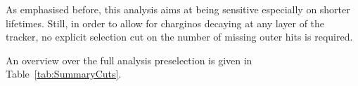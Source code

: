 As emphasised before, this analysis aims at being sensitive especially on shorter lifetimes.
Still, in order to allow for charginos decaying at any layer of the tracker, no explicit selection cut on the number of missing outer hits is required.

An overview over the full analysis preselection is given in Table~\ref{tab:SummaryCuts}. 
\renewcommand{\arraystretch}{1.39}
\begin{table}[!h]
\centering
\caption{Summary and categorisation of the analysis selection.}
\label{tab:SummaryCuts}
\end{table}
